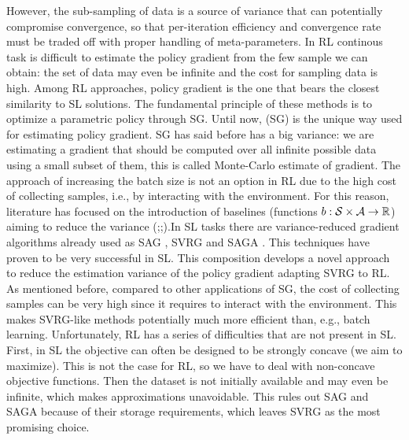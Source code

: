However, the sub-sampling of data is a source of variance that can potentially compromise convergence, so that per-iteration efficiency and convergence rate must be traded off with proper handling of meta-parameters. In \acs{RL} continous task is difficult to estimate the policy gradient from the few sample we can obtain: the set of data may even be infinite and the cost for sampling data is high.
Among RL approaches, policy gradient is the one that bears the closest similarity to \acs{SL} solutions. The fundamental principle of these methods is to optimize a parametric policy through \acs{SG}.
Until now, (\acs{SG}) is the unique way used for estimating policy gradient. \acs{SG} has said before has a big variance: we are estimating a gradient that should be computed over all infinite possible data using a small subset of them, this is called Monte-Carlo estimate of gradient. The approach of increasing the batch size is not an option in \acs{RL} due to the high cost of collecting samples, i.e., by interacting with the environment. For this reason, literature has focused on the introduction of baselines  (\ie functions $b : \mathcal{S} \times \mathcal{A} \to \mathbb R$) aiming to reduce the variance (\cite{williams1992simple};\cite{peters2008reinforcement};\cite{thomas2017policy}).\newline In \acs{SL} tasks there are variance-reduced gradient algorithms already used as \acs{SAG} \citep{roux2012stochastic}, \acs{SVRG} \citep{allen2016variance} and \acs{SAGA} \citep{defazio2014saga}. This techniques have proven to be very successful in \acs{SL}.\newline
This composition develops a novel approach to reduce the estimation variance of the policy gradient adapting \acs{SVRG} to \acs{RL}.\newline
As mentioned before, compared to other applications of \acs{SG}, the cost of collecting samples can be very high since it requires to interact with the environment.
This makes \ac{SVRG}-like methods potentially much more efficient than, e.g., batch learning. 
Unfortunately, RL has a series of difficulties that are not present in \acs{SL}. First, in \acs{SL} the objective can often be designed to be strongly concave (we aim to maximize). This is not the case for \acs{RL}, so we have to deal with non-concave objective functions. Then the dataset is not initially available and may even be infinite, which makes approximations unavoidable. This rules out \acs{SAG} and \acs{SAGA} because of their storage requirements, which leaves \acs{SVRG} as the most promising choice.
